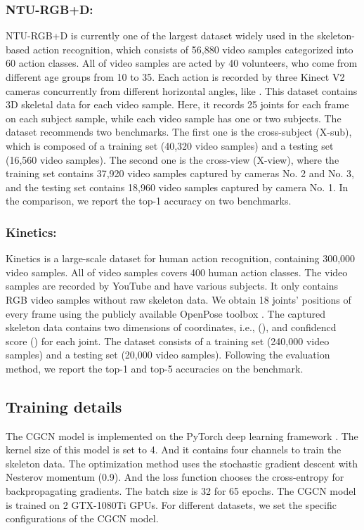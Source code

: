\documentclass[runningheads]{llncs}
\begin{document}
\subsubsection{NTU-RGB+D:} NTU-RGB+D is currently one of the largest dataset widely used in the skeleton-based action recognition, which consists of 56,880 video samples categorized into 60 action classes. All of video samples are acted by 40 volunteers, who come from different age groups from 10 to 35. Each action is recorded by three Kinect V2 cameras concurrently from different horizontal angles, like . This dataset contains 3D skeletal data for each video sample. Here, it records 25 joints for each frame on each subject sample, while each video sample has one or two subjects. The dataset recommends two benchmarks. The first one is the cross-subject (X-sub), which is composed of a training set (40,320 video samples) and a testing set (16,560 video samples). The second one is the cross-view (X-view), where the training set contains 37,920 video samples captured by cameras No. 2 and No. 3, and the testing set contains 18,960 video samples captured by camera No. 1. In the comparison, we report the top-1 accuracy on two benchmarks.

\subsubsection{Kinetics:} Kinetics is a large-scale dataset for human action recognition, containing 300,000 video samples. All of video samples covers 400 human action classes. The video samples are recorded by YouTube and have various subjects. It only contains RGB video samples without raw skeleton data. We obtain 18 joints' positions of every frame using the publicly available OpenPose toolbox \cite{cao2017realtime}. The captured skeleton data contains two dimensions of coordinates, i.e., (), and confidencd score () for each joint. The dataset consists of a training set (240,000 video samples) and a testing set (20,000 video samples). Following the evaluation method, we report the top-1 and top-5 accuracies on the benchmark. 

\subsection{Training details}
The CGCN model is implemented on the PyTorch deep learning framework \cite{paszke2017automatic}. The kernel size of this model is set to 4. And it contains four channels to train the skeleton data. The optimization method uses the stochastic gradient descent with Nesterov momentum (0.9). And the loss function chooses the cross-entropy for backpropagating gradients. The batch size is 32 for 65 epochs. The CGCN model is trained on 2 GTX-1080Ti GPUs. For different datasets, we set the specific configurations of the CGCN model. 
\end{document}
